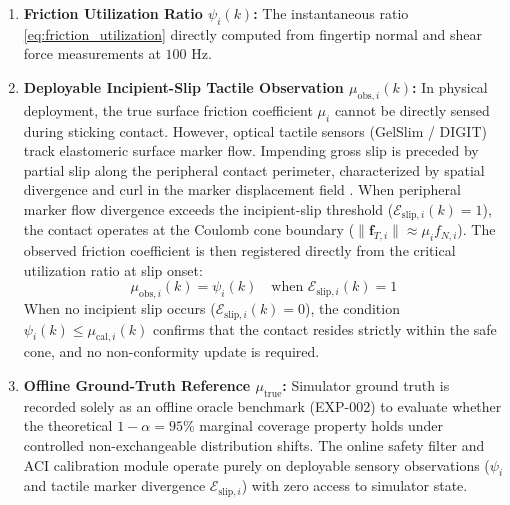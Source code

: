 \begin{enumerate}
    \item \textbf{Friction Utilization Ratio $\psi_i(k)$:} The instantaneous ratio \eqref{eq:friction_utilization} directly computed from fingertip normal and shear force measurements at $100\text{ Hz}$.
    \item \textbf{Deployable Incipient-Slip Tactile Observation $\mu_{\text{obs}, i}(k)$:} In physical deployment, the true surface friction coefficient $\mu_i$ cannot be directly sensed during sticking contact. However, optical tactile sensors (GelSlim / DIGIT) track elastomeric surface marker flow. Impending gross slip is preceded by partial slip along the peripheral contact perimeter, characterized by spatial divergence and curl in the marker displacement field \cite{pandas2024incipient,yuan2017gelsight}. When peripheral marker flow divergence exceeds the incipient-slip threshold ($\mathcal{E}_{\text{slip}, i}(k) = 1$), the contact operates at the Coulomb cone boundary ($\|\mathbf{f}_{T, i}\| \approx \mu_i f_{N, i}$). The observed friction coefficient is then registered directly from the critical utilization ratio at slip onset:
    \begin{equation}
        \mu_{\text{obs}, i}(k) = \psi_i(k) \quad \text{when } \mathcal{E}_{\text{slip}, i}(k) = 1
    \end{equation}
    When no incipient slip occurs ($\mathcal{E}_{\text{slip}, i}(k) = 0$), the condition $\psi_i(k) \le \mu_{\text{cal}, i}(k)$ confirms that the contact resides strictly within the safe cone, and no non-conformity update is required.
    \item \textbf{Offline Ground-Truth Reference $\mu_{\text{true}}$:} Simulator ground truth is recorded solely as an offline oracle benchmark (EXP-002) to evaluate whether the theoretical $1 - \alpha = 95\%$ marginal coverage property holds under controlled non-exchangeable distribution shifts. The online safety filter and ACI calibration module operate purely on deployable sensory observations ($\psi_i$ and tactile marker divergence $\mathcal{E}_{\text{slip}, i}$) with zero access to simulator state.
\end{enumerate}

